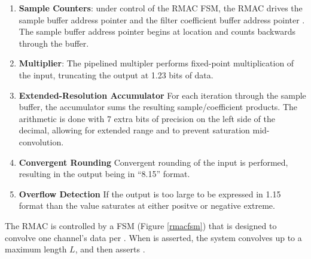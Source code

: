 \begin{enumerate}
\item \textbf{Sample Counters}: under control of the RMAC FSM, the RMAC drives the sample buffer address pointer  and the filter coefficient buffer address pointer . The sample buffer address pointer begins at location  and counts backwards through the buffer. 
\item \textbf{Multiplier}: The pipelined multipler performs fixed-point multiplication of the input, truncating the output at 1.23 bits of data. 
\item \textbf{Extended-Resolution Accumulator} For each iteration through the sample buffer, the accumulator sums the resulting sample/coefficient products. The arithmetic is done with 7 extra bits of precision on the left side of the decimal, allowing for extended range and to prevent saturation mid-convolution. 
\item \textbf{Convergent Rounding} Convergent rounding of the input is performed, resulting in the output being in ``8.15'' format. 
\item \textbf{Overflow Detection} If the output is too large to be expressed in 1.15 format than the value saturates at either positve or negative extreme. 
\end{enumerate}


The RMAC is controlled by a FSM (Figure \ref{rmacfsm}) that is designed to convolve one channel's data per . When  is asserted, the system convolves up to a maximum length $L$, and then asserts . 

